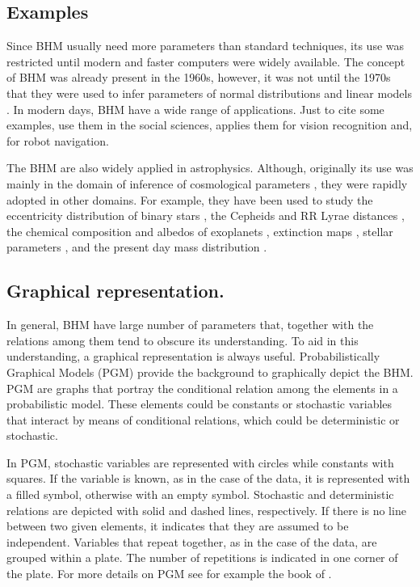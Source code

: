\subsection{Examples}
Since BHM usually need more parameters than standard techniques, its use was restricted until modern and faster computers were widely available. The concept of BHM was already present in the 1960s, however, it was not until  the 1970s that they were used to infer parameters of normal distributions and linear models \cite[see][for an historical perspective of BHM]{Good1980}. In modern days, BHM have a wide range of applications. Just to cite some examples, \citet{Gelman2007} use them in the social sciences, \citet{Fei2005} applies them for vision recognition and, \citet{Diard2008} for robot navigation.

The BHM are also widely applied in astrophysics. Although, originally its use was mainly in the domain of inference of cosmological parameters \cite[see for example the works of][]{Feeney2013,March2014,Anderes2015,Shariff2016,Alsing2017}, they were rapidly adopted in other domains. For example, they have been used to study the eccentricity distribution of binary stars \citet{Hogg2010}, the Cepheids \citep{Barnes2004} and RR Lyrae distances \citep{Jefferys2007}, the chemical composition \citep{Wolfgang2015} and albedos of exoplanets \citep{Demory2014}, extinction maps \citep{Sale2012}, stellar parameters \citep{Shkedy2007}, and the present day mass distribution \citep{Tapiador2017}.

\subsection{Graphical representation.}
In general, BHM have large number of parameters that, together with the relations among them tend to obscure its understanding. To aid in this understanding, a graphical representation is always useful. Probabilistically Graphical Models (PGM) provide the background to graphically depict the BHM. PGM are graphs that portray the conditional relation among the elements in a probabilistic model. These elements could be constants or stochastic variables that interact by means of conditional relations, which could be deterministic or stochastic. 

In PGM, stochastic variables are represented with circles while constants with squares. If the variable is known, as in the case of the data, it is represented with a filled symbol, otherwise with an empty symbol. Stochastic and deterministic relations are depicted with solid and dashed lines, respectively. If there is no line between two given elements, it indicates that they are assumed to be independent. Variables that repeat together, as in the case of the data, are grouped within a plate. The number of repetitions is indicated in one corner of the plate. For more details on PGM see for example the book of \citet{Koller2009}. 

